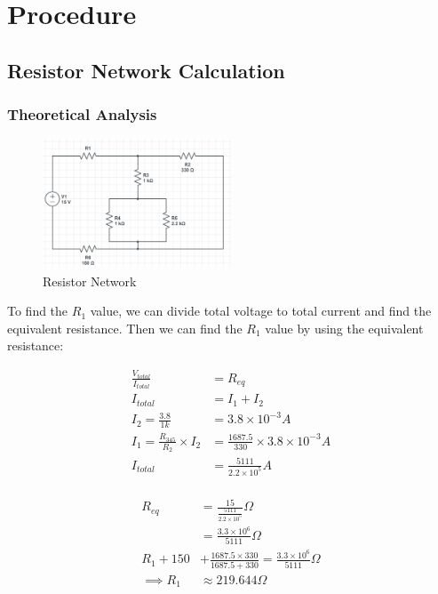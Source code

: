 \chapter{Procedure}

\section{Resistor Network Calculation}

\subsection{Theoretical Analysis}

\begin{figure}[h]
    \centering
    \includegraphics[width=0.5\textwidth]{assets/p1-circuit-scheme.png}
    \caption{Resistor Network}
    \label{fig:resistor_network}
\end{figure}

To find the $R_1$ value, we can divide total voltage to total current and find the equivalent resistance. Then we can find the $R_1$ value by using the equivalent resistance:

\begin{align*}
    \frac{V_{total}}{I_{total}} &= R_{eq} \\
    I_{total} &= I_1 + I_2 \\
    I_2 = \frac{3.8}{1k} &= 3.8\times 10^{-3}A \\
    I_1 = \frac{R_{345}}{R_2}\times I_2 &= \frac{1687.5}{330}\times 3.8\times 10^{-3}A \\
    I_{total} &= \frac{5111}{2.2\times 10^5}A \\
\end{align*}

\newpage
\thispagestyle{plain}

\begin{align*}
    R_{eq} &= \frac{15}{\frac{5111}{2.2\times 10^5}}\Omega \\
    &= \frac{3.3\times10^6}{5111}\Omega \\
    R_1 + 150 &+ \frac{1687.5\times 330}{1687.5 + 330} = \frac{3.3\times10^6}{5111}\Omega \\
    \implies R_1 &\approx 219.644\Omega \\
\end{align*}


